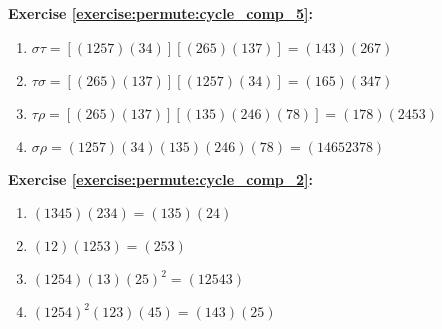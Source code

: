 \noindent\textbf{Exercise \ref{exercise:permute:cycle_comp_5}:}
%
%
\begin{enumerate}[{a.}]
\item
$\sigma\tau = [(1257)(34)][(265)(137)] = (143)(267)$

\item
$\tau \sigma = [(265)(137)][(1257)(34)] = (165)(347)$

\item
$\tau \rho = [(265)(137)][(135)(246)(78)] = (178)(2453)$

\item
$\sigma \rho = (1257)(34)(135)(246)(78) = (14652378)$
\end{enumerate}

\noindent\textbf{Exercise \ref{exercise:permute:cycle_comp_2}:}
\begin{enumerate}[{a.}]
\item
$(1345)(234) = (135)(24)$

\item
$(12)(1253) = (253)$


\item
$(1254)(13)(25)^2 = (12543)$

\item
$(1254)^2(123)(45) = (143)(25)$
\end{enumerate}

